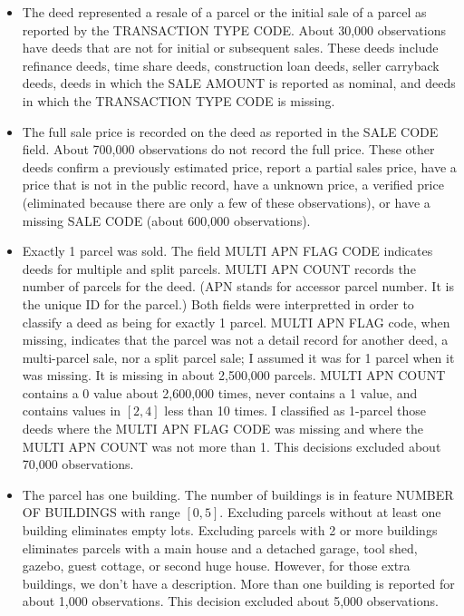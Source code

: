 \begin{itemize}
\begin{description}
  \end{description}

\item The deed represented a resale of a parcel or the initial sale of
  a parcel as reported by the TRANSACTION TYPE CODE. About 30,000
  observations have deeds that are not for initial or subsequent
  sales. These deeds include refinance deeds, time share deeds,
  construction loan deeds, seller carryback deeds, deeds in which the SALE
  AMOUNT is reported as nominal, and deeds in which the TRANSACTION
  TYPE CODE is missing.

\item The full sale price is recorded on the deed as reported in the
  SALE CODE field. About 700,000 observations do not record the full
  price. These other deeds confirm a previously estimated price,
  report a partial sales price, have a price that is not in the public
  record, have a unknown price, a verified price (eliminated because
  there are only a few of these observations), or have a missing SALE
  CODE (about 600,000 observations).

\item Exactly 1 parcel was sold. The field MULTI APN FLAG CODE
  indicates deeds for multiple and split parcels. MULTI APN COUNT
  records the number of parcels for the deed. (APN stands for accessor
  parcel number. It is the unique ID for the parcel.) Both fields were
  interpretted in order to classify a deed as being for exactly 1
  parcel. MULTI APN FLAG code, when missing, indicates that the parcel
  was not a detail record for another deed, a multi-parcel sale, nor
  a split parcel sale; I assumed it was for 1 parcel when it was
  missing. It is missing in about 2,500,000 parcels. MULTI APN COUNT
  contains a 0 value about 2,600,000 times, never contains a 1 value,
  and contains values in $[2,4]$ less than 10 times. I classified as
  1-parcel those deeds where the MULTI APN FLAG CODE was missing and where
  the MULTI APN COUNT was not more than 1.  This decisions excluded
  about 70,000 observations.

\item The parcel has one building. The number of buildings is in
  feature NUMBER OF BUILDINGS with range $[0,5]$. Excluding parcels
  without at least one building eliminates empty lots. Excluding
  parcels with 2 or more buildings eliminates parcels with a main
  house and a detached garage, tool shed, gazebo, guest cottage, or
  second huge house. However, for those extra buildings, we don't have
  a description. More than one building is reported for about 1,000
  observations. This decision excluded about 5,000 observations.


\end{itemize}
